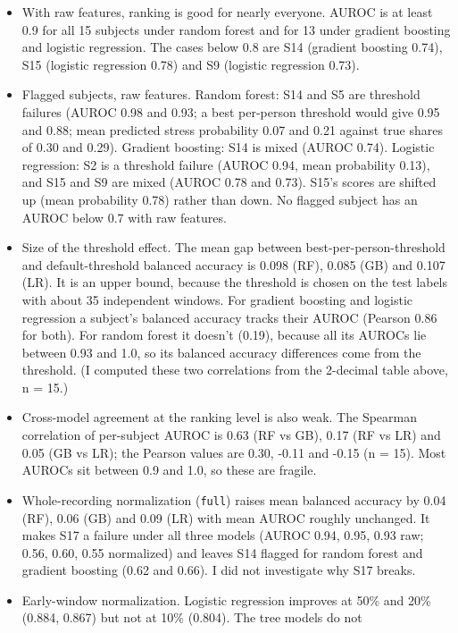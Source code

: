 \documentclass[11pt]{article}
\providecommand{\tightlist}{\setlength{\itemsep}{2pt}\setlength{\parskip}{0pt}}
\begin{document}
\begin{itemize}
\tightlist
\item
  With raw features, ranking is good for nearly everyone. AUROC is at
  least 0.9 for all 15 subjects under random forest and for 13 under
  gradient boosting and logistic regression. The cases below 0.8 are S14
  (gradient boosting 0.74), S15 (logistic regression 0.78) and S9
  (logistic regression 0.73).
\item
  Flagged subjects, raw features. Random forest: S14 and S5 are
  threshold failures (AUROC 0.98 and 0.93; a best per-person threshold
  would give 0.95 and 0.88; mean predicted stress probability 0.07 and
  0.21 against true shares of 0.30 and 0.29). Gradient boosting: S14 is
  mixed (AUROC 0.74). Logistic regression: S2 is a threshold failure
  (AUROC 0.94, mean probability 0.13), and S15 and S9 are mixed (AUROC
  0.78 and 0.73). S15's scores are shifted up (mean probability 0.78)
  rather than down. No flagged subject has an AUROC below 0.7 with raw
  features.
\item
  Size of the threshold effect. The mean gap between
  best-per-person-threshold and default-threshold balanced accuracy is
  0.098 (RF), 0.085 (GB) and 0.107 (LR). It is an upper bound, because
  the threshold is chosen on the test labels with about 35 independent
  windows. For gradient boosting and logistic regression a subject's
  balanced accuracy tracks their AUROC (Pearson 0.86 for both). For
  random forest it doesn't (0.19), because all its AUROCs lie between
  0.93 and 1.0, so its balanced accuracy differences come from the
  threshold. (I computed these two correlations from the 2-decimal table
  above, n = 15.)
\item
  Cross-model agreement at the ranking level is also weak. The Spearman
  correlation of per-subject AUROC is 0.63 (RF vs GB), 0.17 (RF vs LR)
  and 0.05 (GB vs LR); the Pearson values are 0.30, -0.11 and -0.15 (n =
  15). Most AUROCs sit between 0.9 and 1.0, so these are fragile.
\item
  Whole-recording normalization (\texttt{full}) raises mean balanced
  accuracy by 0.04 (RF), 0.06 (GB) and 0.09 (LR) with mean AUROC roughly
  unchanged. It makes S17 a failure under all three models (AUROC 0.94,
  0.95, 0.93 raw; 0.56, 0.60, 0.55 normalized) and leaves S14 flagged
  for random forest and gradient boosting (0.62 and 0.66). I did not
  investigate why S17 breaks.
\item
  Early-window normalization. Logistic regression improves at 50\% and
  20\% (0.884, 0.867) but not at 10\% (0.804). The tree models do not

\end{itemize}
\end{document}
